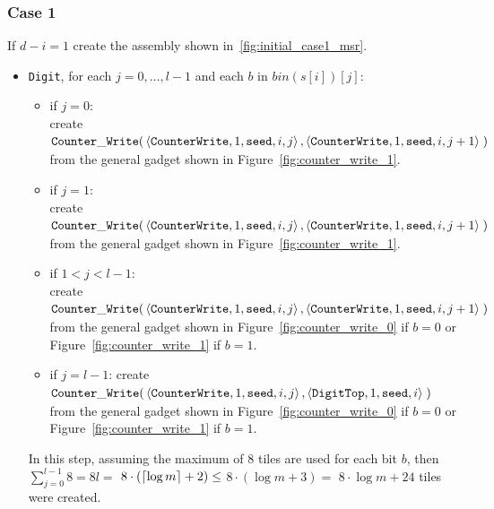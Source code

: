 \subsubsection{Case 1}
%
If $d - i = 1$ create the assembly shown in~\ref{fig:initial_case1_msr}.
%
\begin{itemize}
    \item {\tt Digit}, for each $j=0,\ldots,l-1$ and each $b$ in $bin(s[i])[j]$:
    \begin{itemize}
        \item if $j = 0$:\\ create
        $\begin{aligned}[t]
            \cwrite(&\left\langle {\tt CounterWrite}, 1, {\tt seed}, i, j \right\rangle, \left\langle {\tt CounterWrite}, 1, {\tt seed}, i, j + 1 \right\rangle \;)
        \end{aligned}$\\from the general gadget shown in Figure~\ref{fig:counter_write_1}.

        \item if $j = 1$:\\ create
        $\begin{aligned}[t]
            \cwrite(&\left\langle {\tt CounterWrite}, 1, {\tt seed}, i, j \right\rangle, \left\langle {\tt CounterWrite}, 1, {\tt seed}, i, j + 1 \right\rangle \;)
        \end{aligned}$\\from the general gadget shown in Figure~\ref{fig:counter_write_1}.

        \item if $1 < j < l - 1$:\\ create
        $\begin{aligned}[t]
            \cwrite(&\left\langle {\tt CounterWrite}, 1, {\tt seed}, i, j \right\rangle, \left\langle {\tt CounterWrite}, 1, {\tt seed}, i, j + 1 \right\rangle \;)
        \end{aligned}$\\from the general gadget shown in Figure~\ref{fig:counter_write_0} if $b = 0$ or Figure~\ref{fig:counter_write_1} if $b = 1$.

        \item if $j = l-1$: create
        $\begin{aligned}[t]
            \cwrite(&\left\langle {\tt CounterWrite}, 1, {\tt seed}, i, j \right\rangle, \left\langle {\tt DigitTop}, 1, {\tt seed}, i \right\rangle \;)
        \end{aligned}$\\from the general gadget shown in Figure~\ref{fig:counter_write_0} if $b = 0$ or Figure~\ref{fig:counter_write_1} if $b = 1$.
    \end{itemize}
    In this step, assuming the maximum of 8 tiles are used for each bit $b$, then
    $\sum^{l-1}_{j=0} 8 = 8l =$
    $8 \cdot \left( \ceil*{\log m} + 2 \right) \leq$
    $8 \cdot \left( {\log m} + 3 \right) =$
    $8 \cdot {\log m} + 24$ tiles were created.


\end{itemize}
